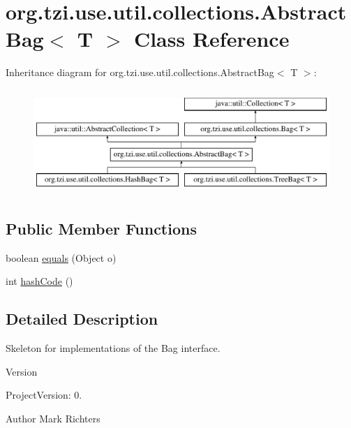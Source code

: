 \hypertarget{classorg_1_1tzi_1_1use_1_1util_1_1collections_1_1_abstract_bag_3_01_t_01_4}{\section{org.\-tzi.\-use.\-util.\-collections.\-Abstract\-Bag$<$ T $>$ Class Reference}
\label{classorg_1_1tzi_1_1use_1_1util_1_1collections_1_1_abstract_bag_3_01_t_01_4}
}
Inheritance diagram for org.\-tzi.\-use.\-util.\-collections.\-Abstract\-Bag$<$ T $>$\-:\begin{figure}[H]
\begin{center}
\leavevmode
\includegraphics[height=4.000000cm]{classorg_1_1tzi_1_1use_1_1util_1_1collections_1_1_abstract_bag_3_01_t_01_4}
\end{center}
\end{figure}
\subsection*{Public Member Functions}
\begin{DoxyCompactItemize}
\item 
boolean \hyperlink{classorg_1_1tzi_1_1use_1_1util_1_1collections_1_1_abstract_bag_3_01_t_01_4_af8e152d2b2ce1604ee554cc15e012de7}{equals} (Object o)
\item 
int \hyperlink{classorg_1_1tzi_1_1use_1_1util_1_1collections_1_1_abstract_bag_3_01_t_01_4_a5219f40f9b09a2214a5eafdd7c1595e4}{hash\-Code} ()
\end{DoxyCompactItemize}


\subsection{Detailed Description}
Skeleton for implementations of the Bag interface.

\begin{DoxyVersion}{Version}

\end{DoxyVersion}
\begin{DoxyParagraph}{Project\-Version\-:}
0. 
\end{DoxyParagraph}
\begin{DoxyAuthor}{Author}
Mark Richters 
\end{DoxyAuthor}


